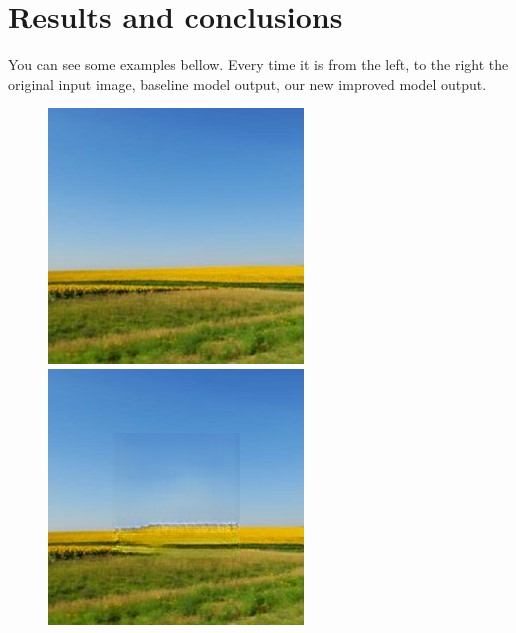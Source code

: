 \documentclass[a4paper, 11pt]{article}
\begin{document}
\section{Results and conclusions}
\label{section:results}
You can see some examples bellow. Every time it is from the left, to the right the original input image, baseline model output, our new improved model output.
\begin{figure}
    \centering
    \begin{minipage}{.3\textwidth}
      \centering
      \includegraphics[width=.95\linewidth]{documentation/img/corny_field.jpg}
    \end{minipage}%
    \begin{minipage}{.3\textwidth}
      \centering
      \includegraphics[width=.95\linewidth]{documentation/img/corny_field_out_45k.png}

\end{minipage}
\end{figure}
\end{document}
